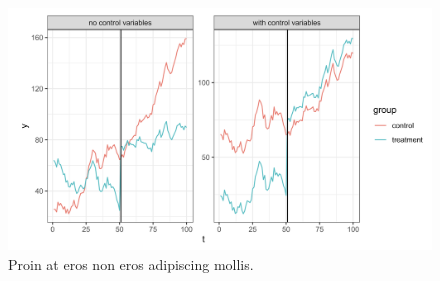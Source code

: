 


\newpage
\thispagestyle{empty}
\begin{landscape}
\thispagestyle{empty}
  \begin{figure}[p]
    \centering
      \includegraphics[width = \linewidth, keepaspectratio]{figures/fig3.png}
      \caption[Lorem Ipsum]{Proin at eros non eros adipiscing mollis.}
    \label{fig:figura3}
  \end{figure}
\end{landscape}

